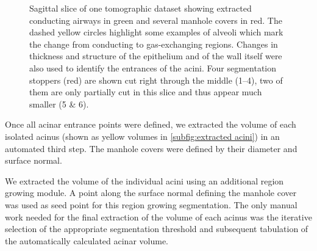 \documentclass[final,paper=a4,DIV=calc,abstract,english]{scrartcl}
\newlength\imagescale		%
\begin{document}
\begin{figure}
%
	\caption{Sagittal slice of one tomographic dataset showing extracted conducting airways in green and several manhole covers in red.
		The dashed yellow circles highlight some examples of alveoli which mark the change from conducting to gas-exchanging regions.
		Changes in thickness and structure of the epithelium and of the wall itself were also used to identify the entrances of the acini.
		Four segmentation stoppers (red) are shown cut right through the middle (\numrange{1}{4}), two of them are only partially cut in this slice and thus appear much smaller (5 \& 6).}
	\label{fig:ManholeCoverExplanation}
\end{figure}

Once all acinar entrance points were defined, we extracted the volume of each isolated acinus (shown as yellow volumes in \autoref{subfig:extracted acini}) in an automated third step.
The manhole covers were defined by their diameter and surface normal.

We extracted the volume of the individual acini using an additional region growing module.
A point along the surface normal defining the manhole cover was used as seed point for this region growing segmentation.
The only manual work needed for the final extraction of the volume of each acinus was the iterative selection of the appropriate segmentation threshold and subsequent tabulation of the automatically calculated acinar volume.
\end{document}
